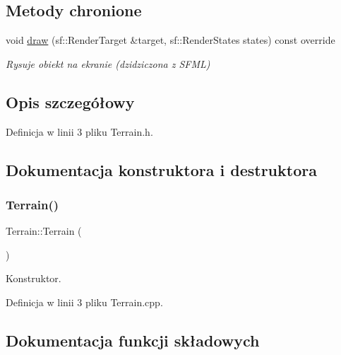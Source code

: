 \subsection*{Metody chronione}
\begin{DoxyCompactItemize}
\item 
void \mbox{\hyperlink{class_terrain_a78fb38a85917a89fa9deb9eec9599b49}{draw}} (sf\+::\+Render\+Target \&target, sf\+::\+Render\+States states) const override
\begin{DoxyCompactList}\small\item\em Rysuje obiekt na ekranie (dzidziczona z S\+F\+ML) \end{DoxyCompactList}\end{DoxyCompactItemize}


\subsection{Opis szczegółowy}


Definicja w linii 3 pliku Terrain.\+h.



\subsection{Dokumentacja konstruktora i destruktora}
\mbox{\label{class_terrain_a7160a06ab07a86ed97d23374405e8ef6}} 
\subsubsection{\texorpdfstring{Terrain()}{Terrain()}}
{\footnotesize\ttfamily Terrain\+::\+Terrain (\begin{DoxyParamCaption}{ }\end{DoxyParamCaption})}



Konstruktor. 



Definicja w linii 3 pliku Terrain.\+cpp.



\subsection{Dokumentacja funkcji składowych}
\mbox{\label{class_terrain_a78fb38a85917a89fa9deb9eec9599b49}} 
